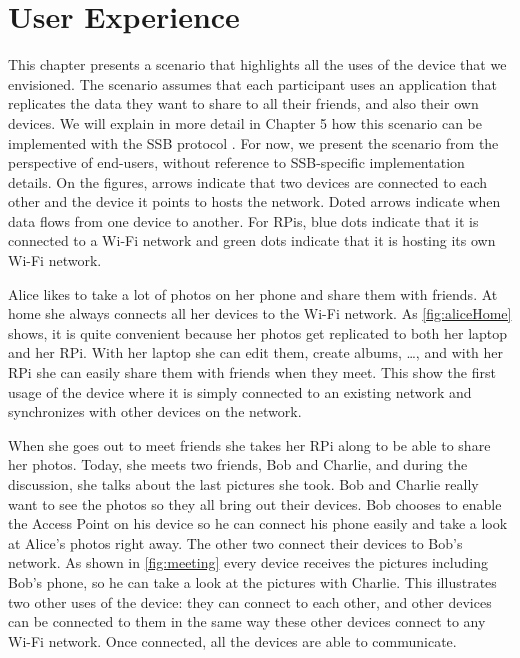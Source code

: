 \documentclass[a4paper,11pt,oneside]{report}
\begin{document}
\chapter{User Experience}
\label{chap:user}

This chapter presents a scenario that highlights all the uses of the device that we envisioned. The scenario assumes that each participant uses an application that replicates the data they want to share to all their friends, and also their own devices. We will explain in more detail
in Chapter 5 how this scenario can be implemented with the SSB protocol \cite{kermarrec2020gossiping}.
For now, we present the scenario from the perspective of end-users, without
reference to SSB-specific implementation details. On the figures, arrows indicate that two devices are connected to each other and the device it points to hosts the network. Doted arrows indicate when data flows from one device to another. For RPis, blue dots indicate that it is connected to a Wi-Fi network and green dots indicate that it is hosting its own Wi-Fi network.

Alice likes to take a lot of photos on her phone and share them with friends. At home she always connects all her devices to the Wi-Fi network. As \autoref{fig:aliceHome} shows, it is quite convenient because her photos get replicated to both her laptop and her RPi. With her laptop she can edit them, create albums, \ldots, and with her RPi she can easily share them with friends when they meet. This show the first usage of the device where it is simply connected to an existing network and synchronizes with other devices on the network.

When she goes out to meet friends she takes her RPi along to be able to share her photos. Today, she meets two friends, Bob and Charlie, and during the discussion, she talks about the last pictures she took. Bob and Charlie really want to see the photos so they all bring out their devices. Bob chooses to enable the Access Point on his device so he can connect his phone easily and take a look at Alice's photos right away. The other two connect their devices to Bob's network. As shown in \autoref{fig:meeting} every device receives the pictures including Bob's phone, so he can take a look at the pictures with Charlie. This illustrates two other uses of the device: they can connect to each other, and other devices can be connected to them in the same way these other devices connect to any Wi-Fi network. Once connected, all the devices are able to communicate.
\end{document}
